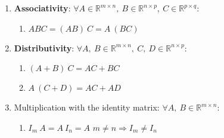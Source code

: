 \begin{enumerate}
    \item \textbf{Associativity}: 
    $
        \forall 
        A\in \mathbb{R}^{m\times n},\ 
        B\in \mathbb{R}^{n\times p},\ 
        C \in \mathbb{R}^{p\times q}
    $:
    
        \begin{enumerate}
            \item $ABC = (AB)\ C = A\ (BC)$
            \hfill \cite{mfml/book/mml/Deisenroth-Faisal-Ong}
        \end{enumerate}

    \item \textbf{Distributivity}: 
    $
        \forall 
        A,\ B\in \mathbb{R}^{m\times n},\ 
        C,\ D\in \mathbb{R}^{n\times p}
    $:

        \begin{enumerate}
            \item $(A + B)\ C = AC + BC$
            \hfill \cite{mfml/book/mml/Deisenroth-Faisal-Ong}
            
            \item $A\ (C + D) = AC + AD$
            \hfill \cite{mfml/book/mml/Deisenroth-Faisal-Ong}
        \end{enumerate}

    \item Multiplication with the identity matrix: 
    $
        \forall 
        A,\ B\in \mathbb{R}^{m\times n}
    $:
        \begin{enumerate}
            \item $I_m\ A = A\ I_n = A$
            \hfill $m\neq n \Rightarrow I_m \neq I_n$
            \hfill \cite{mfml/book/mml/Deisenroth-Faisal-Ong}

            
        \end{enumerate}
\end{enumerate}











